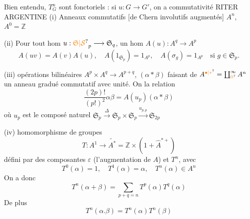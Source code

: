 Bien entendu,   $T_G^n$ sont fonctoriels :
si $u:G\longrightarrow G'$, on a  commutativité 
RITER  ARGENTINE  
(i) Anneaux commutatifs [de Chern involutifs augmentés] $A^n$, $A^0=\mathbb Z$

(ii) Pour tout hom $u:\unsure{\mathfrak S|\mathcal S}_p\longrightarrow\mathfrak S_q$, un hom $A(u):A^q\longrightarrow A^p$
\[
A(uv)=A(v)A(u),\quad A(1_{\mathfrak S_p})=1_{A^p},\quad A(\sigma_g)=1_{A^p}\quad\text{si }g\in\mathfrak S_p.
\]

(iii)  opérations bilinéaires $A^p\times A^q\longrightarrow A^{p+q}$, $(\alpha*\beta)$
faisant de $A^{\unsure{\bullet|*}}=\coprod_{\unsure{0}}^\infty A^n$ un anneau gradué commutatif
avec unité. On  la relation
\[
\frac{(2p)!}{(p!)^2}\alpha\beta=A(u_p)(\alpha*\beta)
\]
où $u_p$ est le composé naturel $\mathfrak S_p\xrightarrow{\Delta}\mathfrak S_p\times\mathfrak S_p\xrightarrow{u_{p,p}}\mathfrak S_{2p}$

(iv)  homomorphisme de groupes
\[
T:A^1\longrightarrow\widetilde{A^*}=\mathbb Z\times(1+\widehat A^{*+})
\]
défini par des composantes $\varepsilon$ (l'augmentation de $A$)
et $T^n$, avec
\[
T^0(\alpha)=1,\quad T^1(\alpha)=\alpha,\quad T^n(\alpha)\in A^n
\]
On a donc
\[
T^n(\alpha+\beta)=\sum_{p+q=n}T^p(\alpha)T^q(\alpha)
\]
De plus
\[
T^n(\alpha.\beta)=T^n(\alpha)T^n(\beta)
\]

